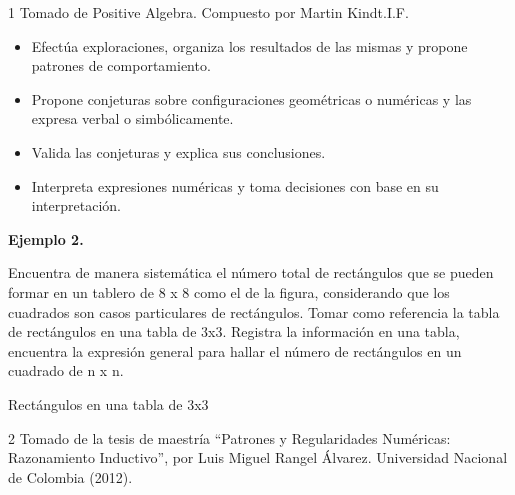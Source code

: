 

1 Tomado de Positive Algebra. Compuesto por Martin Kindt.I.F.


\evidencias

\begin{itemize}
  \item Efectúa exploraciones, organiza los resultados de las mismas y propone patrones de comportamiento.
  \item Propone conjeturas sobre configuraciones geométricas o numéricas y las expresa verbal o simbólicamente.
  \item Valida las conjeturas y explica sus conclusiones.
  \item Interpreta expresiones numéricas y toma decisiones con base en su interpretación.
\end{itemize}

\ejemplo

\textbf{Ejemplo 2.}

Encuentra de manera sistemática el número total de rectángulos que se pueden formar en un tablero de 8 x 8 como el de la figura, considerando que los cuadrados son casos particulares de rectángulos. Tomar como referencia la tabla de rectángulos en una tabla de 3x3. Registra la información en una tabla, encuentra la expresión general para hallar el número de rectángulos en un cuadrado de n x n.


Rectángulos en una tabla de 3x3


2 Tomado de la tesis de maestría “Patrones y Regularidades Numéricas: Razonamiento Inductivo”, por Luis Miguel Rangel Álvarez. Universidad Nacional de Colombia (2012).


